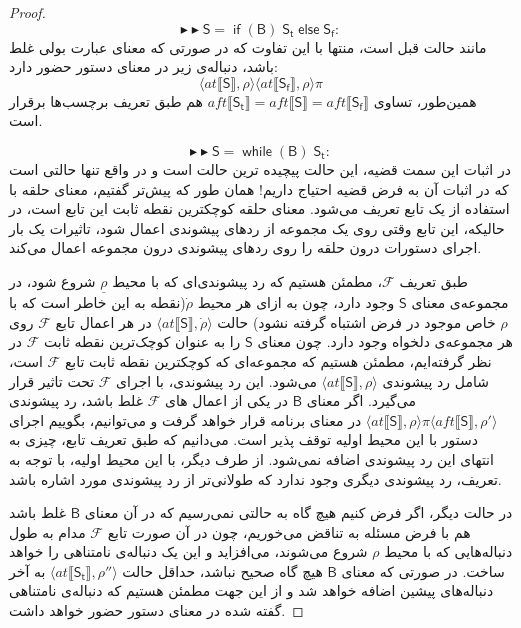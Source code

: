 \begin{proof}
$$\blacktriangleright\blacktriangleright \mathsf{S=\; if\;(B)\;S_t\;else\;S_f}:$$
مانند حالت قبل است، منتها با این تفاوت که در صورتی که معنای عبارت بولی غلط باشد، دنباله‌ی زیر در معنای دستور حضور دارد:
	$$\langle at \llbracket \mathsf{S} \rrbracket , \rho \rangle
\langle at \llbracket \mathsf{S_f} \rrbracket , \rho \rangle \pi$$
همین‌طور، تساوی 
$aft \llbracket \mathsf{S_t} \rrbracket=aft \llbracket \mathsf{S} \rrbracket=aft \llbracket \mathsf{S_f} \rrbracket$
هم طبق تعریف برچسب‌ها برقرار است.

$$\blacktriangleright\blacktriangleright \mathsf{S=\; while\;(B)\;S_t}:$$
در اثبات این سمت قضیه، این حالت پیچیده ترین حالت است و در واقع تنها حالتی است که در اثبات آن به فرض قضیه احتیاج داریم! همان طور که پیش‌تر گفتیم، معنای حلقه با استفاده از یک تابع تعریف می‌شود. معنای حلقه کوچکترین نقطه ثابت این تابع است، در حالیکه، این تابع وقتی روی یک مجموعه از ردهای پیشوندی اعمال شود، تاثیرات یک بار اجرای دستورات درون حلقه را روی ردهای پیشوندی درون مجموعه اعمال می‌کند.

طبق تعریف $\mathcal{F}$، مطمئن هستیم که رد پیشوندی‌ای که با محیط $\underline{\rho}$ شروع شود، در مجموعه‌ی معنای $\mathsf{S}$ وجود دارد، چون به ازای هر محیط $\dot{\rho}$(نقطه به این خاطر است که با $\rho$ خاص موجود در فرض اشتباه گرفته نشود) حالت 
$\langle at \llbracket \mathsf{S} \rrbracket, \dot{\rho} \rangle$
 در هر اعمال تابع $\mathcal{F}$ روی هر مجموعه‌ی دلخواه وجود دارد. چون معنای $\mathsf{S}$ را به عنوان کوچک‌ترین نقطه ثابت $\mathcal{F}$ در نظر گرفته‌ایم، مطمئن هستیم که مجموعه‌ای که کوچکترین نقطه ثابت تابع $\mathcal{F}$ است، شامل رد پیشوندی 
 $\langle at \llbracket \mathsf{S} \rrbracket, \rho \rangle$
 می‌شود. این رد پیشوندی، با اجرای $\mathcal{F}$ تحت تاثیر قرار می‌گیرد. اگر معنای $\mathsf{B}$ در یکی از اعمال های $\mathcal{F}$ غلط باشد، رد پیشوندی
$ \langle at \llbracket \mathsf{S} \rrbracket, \rho \rangle \pi \langle aft \llbracket \mathsf{S} \rrbracket , \rho' \rangle$ 
در معنای برنامه قرار خواهد گرفت و می‌توانیم، بگوییم اجرای دستور با این محیط اولیه توقف پذیر است. می‌دانیم که طبق تعریف تابع، چیزی به انتهای این رد پیشوندی اضافه نمی‌شود. از طرف دیگر، با این محیط اولیه، با توجه به تعریف، رد پیشوندی دیگری وجود ندارد که طولانی‌تر از رد پیشوندی مورد اشاره باشد. 

در حالت دیگر، اگر فرض کنیم هیچ گاه به حالتی نمی‌رسیم که در آن معنای $\mathsf{B}$ غلط باشد هم با فرض مسئله به تناقض می‌خوریم، چون در آن صورت تابع $\mathcal{F}$ مدام به طول دنباله‌‌هایی که با محیط $\rho$ شروع می‌شوند، می‌افزاید و این یک دنباله‌ی نامتناهی را خواهد ساخت. در صورتی که معنای $\mathsf{B}$ هیچ گاه صحیح نباشد، حداقل حالت 
$\langle at \llbracket \mathsf{S_t} \rrbracket , \rho'' \rangle$
به آخر دنباله‌های پیشین اضافه خواهد شد و از این جهت مطمئن هستیم که دنباله‌ی نامتناهی گفته شده در معنای دستور حضور خواهد داشت. 


\end{proof}
